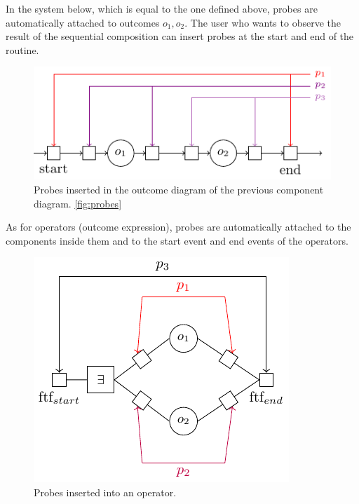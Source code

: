         In the system below, which is equal to the one defined above, probes are automatically attached to outcomes $o_1, o_2$. The user who wants to observe the result of the sequential composition can insert probes at the start and end of the routine. 

        \begin{figure}[H]
            \begin{center}
                \includegraphics[scale=1.3]{tikz/probe_1.pdf}
            \end{center}
            \label{fig:probes_o}
            \caption{Probes inserted in the outcome diagram of the previous component diagram. \ref{fig:probes}}
        \end{figure}
       
       As for operators (outcome expression), probes are automatically attached to the components inside them and to the start event and end events of the operators. 

       \begin{figure}[H]
           \begin{center}
                \includegraphics[scale = 1.3]{tikz/probe_2.pdf}
            \end{center}
            \label{fig:probes_op}
            \caption{Probes inserted into an operator.}
       \end{figure}
    

